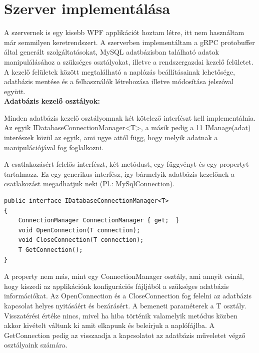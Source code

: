 \documentclass[
]{thesis-ekf}
\theoremstyle{definition}
\theoremstyle{remark}
\begin{document}
\section {Szerver implementálása}
A szervernek is egy kisebb WPF applikációt hoztam létre, itt nem használtam már semmilyen keretrendszert. A szerverben implementáltam a gRPC protobuffer által generált szolgáltatásokat, MySQL adatbázisban található adatok manipulálásához a szükséges osztályokat, illetve a rendszergazdai kezelő felületet.  A kezelő felületek között megtalálható a naplózás beállításainak lehetősége, adatbázis mentése és a felhasználók létrehozása illetve módosítása jelszóval együtt.\\
\textbf{Adatbázis kezelő osztályok:}

Minden adatbázis kezelő osztályomnak két kötelező interfészt kell implementálnia. Az egyik IDatabaseConnectionManager<T>, a másik pedig a 11 IManage(adat) interészek közül az egyik, ami ugye attól függ, hogy melyik adatnak a manipulációjával fog foglalkozni.

A csatlakozásért felelős interfészt, két metódust, egy függvényt és egy propertyt tartalmazz.
Ez egy generikus interfész, így bármelyik adatbázis kezelőnek a csatlakozást megadhatjuk neki (Pl.: MySqlConnection).
\begin{lstlisting}[caption={Kötelező interfész adatbázist kezelő osztályok számára.},captionpos=b]
public interface IDatabaseConnectionManager<T>
{     
	ConnectionManager ConnectionManager { get;  }
	void OpenConnection(T connection);
	void CloseConnection(T connection);
	T GetConnection();
}
\end{lstlisting}
A property nem más, mint egy ConnectionManager osztály, ami annyit csinál, hogy kiszedi az applikációnk konfigurációs fájljából a szükséges adatbázis információkat. Az OpenConnection és a CloseConnection fog felelni az adatbázis kapcsolat helyes nyitásáért és bezárásért. A bemeneti paraméterek a T osztály. Visszatérési értéke nincs, mivel ha hiba történik valamelyik metódus közben akkor kivételt váltunk ki amit elkapunk és beleírjuk a naplófájlba. A GetConnection pedig az visszaadja a kapcsolatot az adatbázis műveletet végző osztályaink számára.
\end{document}
